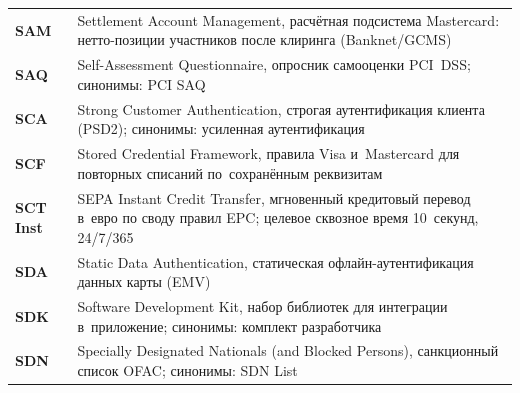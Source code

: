 \begin{longtable}{@{}p{4.5em}p{\dimexpr\linewidth-4.5em-2\tabcolsep\relax}@{}}
  \textbf{SAM}               & Settlement Account Management, расчётная подсистема Mastercard: нетто-позиции участников после клиринга (Banknet/GCMS)                                                                                                                                                                               \\
  \textbf{SAQ}               & Self-Assessment Questionnaire, опросник самооценки PCI~DSS; синонимы: PCI SAQ                                                                                                                                                                                                                    \\
  \textbf{SCA}               & Strong Customer Authentication, строгая аутентификация клиента (PSD2); синонимы: усиленная аутентификация                                                                                                                                                                                         \\
  \textbf{SCF}               & Stored Credential Framework, правила Visa и~Mastercard для повторных списаний по~сохранённым реквизитам                                                                                                                                                                                          \\
  \textbf{SCT Inst}          & SEPA Instant Credit Transfer, мгновенный кредитовый перевод в~евро по своду правил EPC; целевое сквозное время 10~секунд, 24/7/365                                                                                                                                                                 \\
  \textbf{SDA}               & Static Data Authentication, статическая офлайн-аутентификация данных карты (EMV)                                                                                                                                                                                                                 \\
  \textbf{SDK}               & Software Development Kit, набор библиотек для интеграции в~приложение; синонимы: комплект разработчика                                                                                                                                                                                           \\
  \textbf{SDN}               & Specially Designated Nationals (and Blocked Persons), санкционный список OFAC; синонимы: SDN List                                                                                                                                                                                                \\

\end{longtable}
